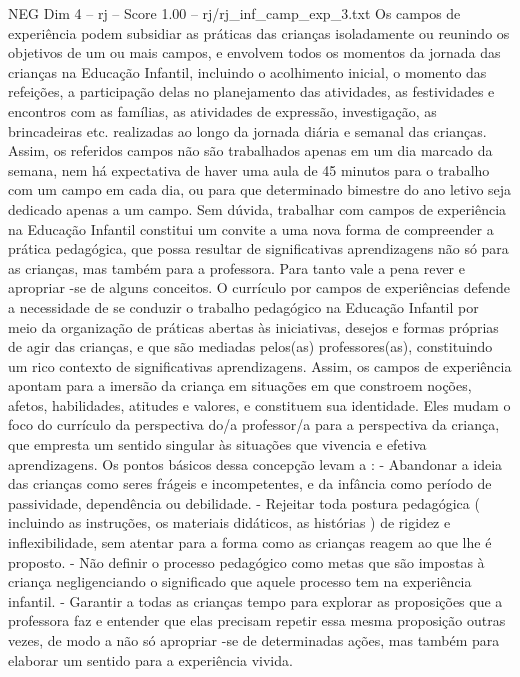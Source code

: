 \begin{textsample}{NEG Dim 4 – rj – Score 1.00 – rj/rj\_inf\_camp\_exp\_3.txt}  \label{ex:f4_neg_129}
Os campos de experiência podem subsidiar as práticas das crianças isoladamente ou reunindo os objetivos de um ou mais campos, e envolvem todos os momentos da jornada das crianças na Educação Infantil, incluindo o acolhimento inicial, o momento das refeições, a participação delas no planejamento das atividades, as festividades e encontros com as famílias, as atividades de expressão, investigação, as brincadeiras etc. realizadas ao longo da jornada diária e semanal das crianças.
Assim, os referidos campos não são trabalhados apenas em um dia marcado da semana, nem há expectativa de haver uma aula de 45 minutos para o trabalho com um campo em cada dia, ou para que determinado bimestre do ano letivo seja dedicado apenas a um campo.
Sem dúvida, trabalhar com campos de experiência na Educação Infantil constitui um convite a uma nova forma de compreender a prática pedagógica, que possa resultar de significativas aprendizagens não só para as crianças, mas também para a professora.
Para tanto vale a pena rever e apropriar -se de alguns conceitos.
O currículo por campos de experiências defende a necessidade de se conduzir o trabalho pedagógico na Educação Infantil por meio da organização de práticas abertas às iniciativas, desejos e formas próprias de agir das crianças, e que são mediadas pelos(as) professores(as), constituindo um rico contexto de significativas aprendizagens.
Assim, os campos de experiência apontam para a imersão da criança em situações em que constroem noções, afetos, habilidades, atitudes e valores, e constituem sua identidade.
Eles mudam o foco do currículo da perspectiva do/a professor/a para a perspectiva da criança, que empresta um sentido singular às situações que vivencia e efetiva aprendizagens.
Os pontos básicos dessa concepção levam a : - Abandonar a ideia das crianças como seres frágeis e incompetentes, e da infância como período de passividade, dependência ou debilidade. - Rejeitar toda postura pedagógica ( incluindo as instruções, os materiais didáticos, as histórias ) de rigidez e inflexibilidade, sem atentar para a forma como as crianças reagem ao que lhe é proposto. - Não definir o processo pedagógico como metas que são impostas à criança negligenciando o significado que aquele processo tem na experiência infantil. - Garantir a todas as crianças tempo para explorar as proposições que a professora faz e entender que elas precisam repetir essa mesma proposição outras vezes, de modo a não só apropriar -se de determinadas ações, mas também para elaborar um sentido para a experiência vivida.

\end{textsample}
